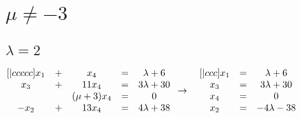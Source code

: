 \documentclass{article}
\begin{document}
    \section{\(\mu \neq -3\)}
    \subsection{\(\lambda = 2\)}
    \begin{math}
        \begin{matrix}[|ccccc]
            x_1 & + & x_4 & = & \lambda + 6\\
            x_3 & + & 11x_4 & = & 3\lambda + 30\\
            ~ & ~ & (\mu + 3)x_4 & = & 0\\
            -x_2 & + & 13x_4 & = & 4\lambda + 38
        \end{matrix}\\
        \\
        \\
        \to\quad
        \begin{matrix}[|ccc]
            x_1 & = & \lambda + 6\\
            x_3 & = & 3\lambda + 30\\
            x_4 & = & 0\\
            x_2 & = & -4\lambda - 38
        \end{matrix}
    \end{math}
\end{document}
